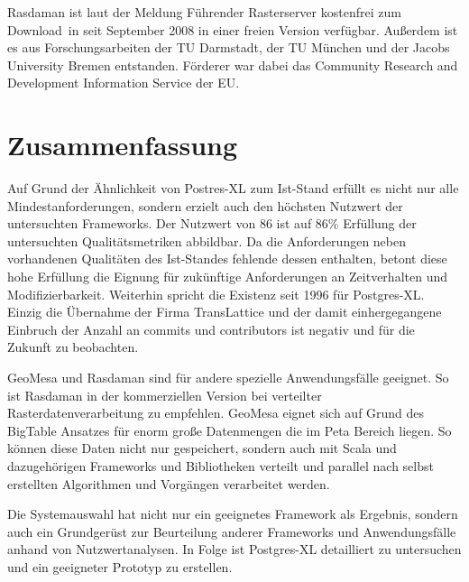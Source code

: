 Rasdaman ist laut der Meldung \glqq Führender Rasterserver kostenfrei zum Download\grqq\ in \cite{website:rasdaman-newsarchive} seit September 2008 in einer freien Version verfügbar.
Außerdem ist es aus Forschungsarbeiten der TU Darmstadt, der TU München und der Jacobs University Bremen entstanden.
Förderer war dabei das Community Research and Development Information Service der EU. \cite{website:rasdaman-cordis}

\section{Zusammenfassung}
Auf Grund der Ähnlichkeit von Postres-XL zum Ist-Stand erfüllt es nicht nur alle Mindestanforderungen, sondern erzielt auch den höchsten Nutzwert der untersuchten Frameworks.
Der Nutzwert von 86 ist auf 86\% Erfüllung der untersuchten Qualitätsmetriken abbildbar.
Da die Anforderungen neben vorhandenen Qualitäten des Ist-Standes fehlende dessen enthalten, betont diese hohe Erfüllung die Eignung für zukünftige Anforderungen an Zeitverhalten und Modifizierbarkeit.
Weiterhin spricht die Existenz seit 1996 für Postgres-XL.
Einzig die Übernahme der Firma TransLattice und der damit einhergegangene Einbruch der Anzahl an commits und contributors ist negativ und für die Zukunft zu beobachten.

GeoMesa und Rasdaman sind für andere spezielle Anwendungsfälle geeignet.
So ist Rasdaman in der kommerziellen Version bei verteilter Rasterdatenverarbeitung zu empfehlen.
GeoMesa eignet sich auf Grund des BigTable Ansatzes für enorm große Datenmengen die im Peta Bereich liegen.
So können diese Daten nicht nur gespeichert, sondern auch mit Scala und dazugehörigen Frameworks und Bibliotheken verteilt und parallel nach selbst erstellten Algorithmen und Vorgängen verarbeitet werden.

Die Systemauswahl hat nicht nur ein geeignetes Framework als Ergebnis, sondern auch ein Grundgerüst zur Beurteilung anderer Frameworks und Anwendungsfälle anhand von Nutzwertanalysen.
In Folge ist Postgres-XL detailliert zu untersuchen und ein geeigneter Prototyp zu erstellen.